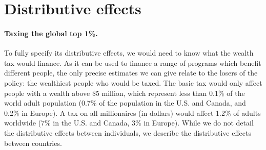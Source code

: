 \documentclass[12pt,english]{article}
\begin{document}

\section{Distributive effects}\label{sec:distribution}

\paragraph{Taxing the global top 1\%.} To fully specify its distributive effects, we would need to know what the wealth tax would finance. As it can be used to finance a range of programs which benefit different people, the only precise estimates we can give relate to the losers of the policy: the wealthiest people who would be taxed. The basic tax would only affect people with a wealth above \$5 million, which represent less than 0.1\% of the world adult population (0.7\% of the population in the U.S. and Canada, and 0.2\% in Europe). A tax on all millionaires (in dollars) would affect 1.2\% of adults worldwide (7\% in the U.S. and Canada, 3\% in Europe). While we do not detail the distributive effects between individuals, we describe the distributive effects between countries.

\end{document}
